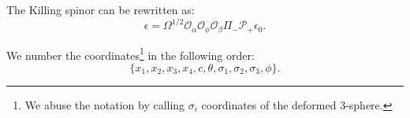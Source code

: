 The Killing spinor can be rewritten as:
\begin{equation}\label{eq:KillingSpinor}
\boxed{ \epsilon = \Omega^{1/2} \mathcal{O}_\alpha \mathcal{O}_\phi \mathcal{O}_\beta \Pi_{-} \mathcal{P}_+ \epsilon_0}.
\end{equation}



We number the coordinates\footnote{We abuse the notation by calling $\sigma_i$ coordinates of the deformed 3-sphere.} in the following order:
\begin{equation}
 \{x_1, x_2, x_3, x_4, c, \theta, \sigma_1, \sigma_2, \sigma_3, \phi\}. 
\end{equation}


